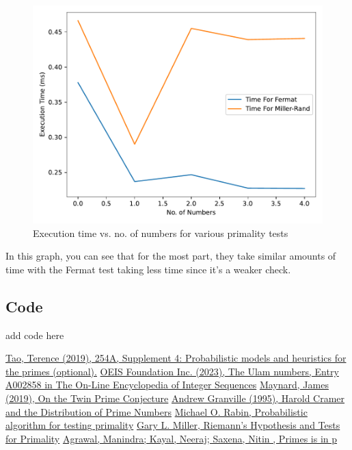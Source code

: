 \documentclass[conference]{IEEEtran}
\begin{document}
\begin{figure}[H]
  \centering
  \includegraphics[width=\linewidth,keepaspectratio]{Fermat-MillerRand.pdf}
  \caption{Execution time vs. no. of numbers for various primality tests}
\end{figure}

In this graph, you can see that for the most part, they take similar amounts of time with the Fermat test taking less time since it's a weaker check.

\subsection{Code}
add code here

\begin{thebibliography}{00}
     \href{https://terrytao.wordpress.com/2015/01/04/254a-supplement-4-probabilistic-models-and-heuristics-for-the-primes-optional.}{Tao, Terence (2019), 254A, Supplement 4: Probabilistic models and heuristics for the primes (optional).}
     \href{https://oeis.org/A002858}{OEIS Foundation Inc. (2023), The Ulam numbers, Entry A002858 in The On-Line Encyclopedia of Integer Sequences}
     \href{https://arxiv.org/abs/1910.14674}{Maynard, James (2019), On the Twin Prime Conjecture}
     \href{https://chance.dartmouth.edu/chance_news/for_chance_news/Riemann/cramer.pdf}{Andrew Granville (1995), Harold Cramer and the Distribution of Prime Numbers}
    \href{https://doi.org/10.1016%2F0022-314X%2880%2990084-0}{Michael O. Rabin, Probabilistic algorithm for testing primality}
    \href{https://doi.org/10.1145%2F800116.803773}{Gary L. Miller, Riemann's Hypothesis and Tests for Primality}
    \href{https://doi.org/10.4007%2Fannals.2004.160.781}{Agrawal, Manindra; Kayal, Neeraj; Saxena, Nitin , Primes is in p}
\end{thebibliography}
\vspace{12pt}
\end{document}
